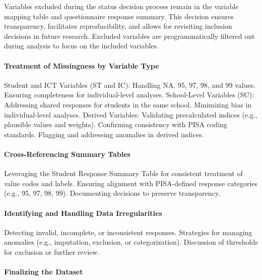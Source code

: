 \documentclass[
]{article}
\begin{document}
Variables excluded during the status decision process remain in the
variable mapping table and questionnaire response summary. This decision
ensures transparency, facilitates reproducibility, and allows for
revisiting inclusion decisions in future research. Excluded variables
are programmatically filtered out during analysis to focus on the
included variables.

\hypertarget{treatment-of-missingness-by-variable-type}{%
\paragraph{Treatment of Missingness by Variable
Type}\label{treatment-of-missingness-by-variable-type}}

Student and ICT Variables (ST and IC): Handling NA, 95, 97, 98, and 99
values. Ensuring completeness for individual-level analyses.
School-Level Variables (SC): Addressing shared responses for students in
the same school. Minimizing bias in individual-level analyses. Derived
Variables: Validating precalculated indices (e.g., plausible values and
weights). Confirming consistency with PISA coding standards. Flagging
and addressing anomalies in derived indices.

\hypertarget{cross-referencing-summary-tables}{%
\paragraph{Cross-Referencing Summary
Tables}\label{cross-referencing-summary-tables}}

Leveraging the Student Response Summary Table for consistent treatment
of value codes and labels. Ensuring alignment with PISA-defined response
categories (e.g., 95, 97, 98, 99). Documenting decisions to preserve
transparency.

\hypertarget{identifying-and-handling-data-irregularities}{%
\paragraph{Identifying and Handling Data
Irregularities}\label{identifying-and-handling-data-irregularities}}

Detecting invalid, incomplete, or inconsistent responses. Strategies for
managing anomalies (e.g., imputation, exclusion, or categorization).
Discussion of thresholds for exclusion or further review.

\hypertarget{finalizing-the-dataset}{%
\paragraph{Finalizing the Dataset}\label{finalizing-the-dataset}}
\end{document}
